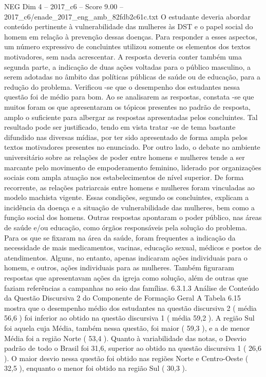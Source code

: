 \begin{textsample}{NEG Dim 4 – 2017\_c6 – Score 9.00 – 2017\_c6/enade\_2017\_eng\_amb\_82fdb2c61c.txt}
O estudante deveria abordar conteúdo pertinente à vulnerabilidade das mulheres às DST e o papel social do homem em relação à prevenção dessas doenças.
Para responder a esses aspectos, um número expressivo de concluintes utilizou somente os elementos dos textos motivadores, sem nada acrescentar.
A resposta deveria conter também uma segunda parte, a indicação de duas ações voltadas para o público masculino, a serem adotadas no âmbito das políticas públicas de saúde ou de educação, para a redução do problema.
Verificou -se que o desempenho dos estudantes nessa questão foi de médio para bom.
Ao se analisarem as respostas, constata -se que muitos foram os que apresentaram os tópicos presentes no padrão de resposta, amplo o suficiente para albergar as respostas apresentadas pelos concluintes.
Tal resultado pode ser justificado, tendo em vista tratar -se de tema bastante difundido nas diversas mídias, por ter sido apresentado de forma ampla pelos textos motivadores presentes no enunciado.
Por outro lado, o debate no ambiente universitário sobre as relações de poder entre homens e mulheres tende a ser marcante pelo movimento de empoderamento feminino, liderado por organizações sociais com ampla atuação nos estabelecimentos de nível superior.
De forma recorrente, as relações patriarcais entre homens e mulheres foram vinculadas ao modelo machista vigente.
Essas condições, segundo os concluintes, explicam a incidência da doença e a situação de vulnerabilidade das mulheres, bem como a função social dos homens.
Outras respostas apontaram o poder público, nas áreas de saúde e/ou educação, como órgãos responsáveis pela solução do problema.
Para os que se fixaram na área da saúde, foram frequentes a indicação da necessidade de mais medicamentos, vacinas, educação sexual, médicos e postos de atendimentos.
Alguns, no entanto, apenas indicaram ações individuais para o homem, e outros, ações individuais para as mulheres.
Também figuraram respostas que apresentavam ações da igreja como solução, além de outras que faziam referências a campanhas no seio das famílias. 6.3.1.3 Análise de Conteúdo da Questão Discursiva 2 do Componente de Formação Geral A Tabela 6.15 mostra que o desempenho médio dos estudantes na questão discursiva 2 ( média 56,6 ) foi inferior ao obtido na questão discursiva 1 ( média 59,2 ).
A região Sul foi aquela cuja Média, também nessa questão, foi maior ( 59,3 ), e a de menor Média foi a região Norte ( 53,4 ).
Quanto à variabilidade das notas, o Desvio padrão de todo o Brasil foi 31,6, superior ao obtido na questão discursiva 1 ( 26,6 ).
O maior desvio nessa questão foi obtido nas regiões Norte e Centro-Oeste ( 32,5 ), enquanto o menor foi obtido na região Sul ( 30,3 ).

\end{textsample}
